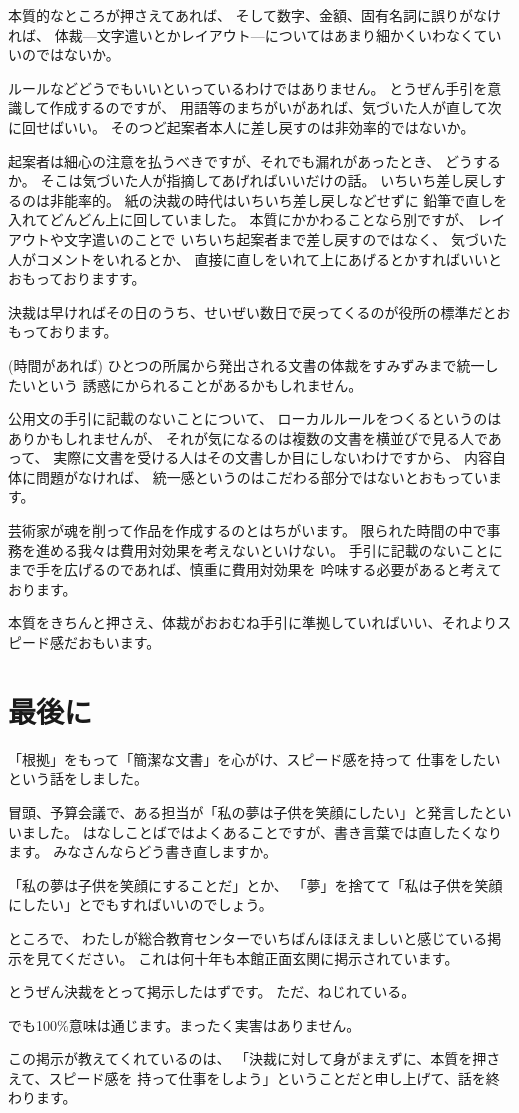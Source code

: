 \documentclass[uplatex,jis2004,dvipdfmx,12pt]{jsarticle}
\begin{document}
本質的なところが押さえてあれば、
そして数字、金額、固有名詞に誤りがなければ、
体裁---文字遣いとかレイアウト---についてはあまり細かくいわなくていいのではないか。


ルールなどどうでもいいといっているわけではありません。
とうぜん手引を意識して作成するのですが、
用語等のまちがいがあれば、気づいた人が直して次に回せばいい。
そのつど起案者本人に差し戻すのは非効率的ではないか。

起案者は細心の注意を払うべきですが、それでも漏れがあったとき、
どうするか。
そこは気づいた人が指摘してあげればいいだけの話。
いちいち差し戻しするのは非能率的。
紙の決裁の時代はいちいち差し戻しなどせずに
鉛筆で直しを入れてどんどん上に回していました。
本質にかかわることなら別ですが、
レイアウトや文字遣いのことで
いちいち起案者まで差し戻すのではなく、
気づいた人がコメントをいれるとか、
直接に直しをいれて上にあげるとかすればいいとおもっておりますす。

決裁は早ければその日のうち、せいぜい数日で戻ってくるのが役所の標準だとお
もっております。

(時間があれば)
ひとつの所属から発出される文書の体裁をすみずみまで統一したいという
誘惑にかられることがあるかもしれません。

公用文の手引に記載のないことについて、
ローカルルールをつくるというのはありかもしれませんが、
それが気になるのは複数の文書を横並びで見る人であって、
実際に文書を受ける人はその文書しか目にしないわけですから、
内容自体に問題がなければ、
統一感というのはこだわる部分ではないとおもっています。

芸術家が魂を削って作品を作成するのとはちがいます。
限られた時間の中で事務を進める我々は費用対効果を考えないといけない。
手引に記載のないことにまで手を広げるのであれば、慎重に費用対効果を
吟味する必要があると考えております。


本質をきちんと押さえ、体裁がおおむね手引に準拠していればいい、それよりス
ピード感だおもいます。

\section{最後に}
「根拠」をもって「簡潔な文書」を心がけ、スピード感を持って
仕事をしたいという話をしました。



冒頭、予算会議で、ある担当が「私の夢は子供を笑顔にしたい」と発言したとい
いました。
はなしことばではよくあることですが、書き言葉では直したくなります。
みなさんならどう書き直しますか。

「私の夢は子供を笑顔にすることだ」とか、
「夢」を捨てて「私は子供を笑顔にしたい」とでもすればいいのでしょう。

ところで、
わたしが総合教育センターでいちばんほほえましいと感じている掲示を見てください。
これは何十年も本館正面玄関に掲示されています。

とうぜん決裁をとって掲示したはずです。
ただ、ねじれている。

でも100\%意味は通じます。まったく実害はありません。


この掲示が教えてくれているのは、
「決裁に対して身がまえずに、本質を押さえて、スピード感を
持って仕事をしよう」ということだと申し上げて、話を終わります。
\end{document}
